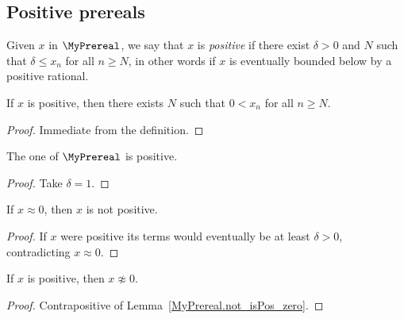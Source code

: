 \subsection{Positive prereals}

\begin{definition}
    \label{MyPrereal.IsPos}
    \leanok
Given $x$ in $\MyPrereal$, we say that $x$ is \emph{positive} if there exist $\delta > 0$ and $N$
such that $\delta \leq x_n$ for all $n \geq N$, in other words if $x$ is eventually bounded below by
a positive rational.
\end{definition}

\begin{lemma}
    \label{MyPrereal.pos_of_isPos}
    \leanok
    If $x$ is positive, then there exists $N$ such that $0 < x_n$ for all $n \geq N$.
\end{lemma}
\begin{proof}
    \leanok
    Immediate from the definition.
\end{proof}

\begin{lemma}
    \label{MyPrereal.one_pos}
    \leanok
    The one of $\MyPrereal$ is positive.
\end{lemma}
\begin{proof}
    \leanok
    Take $\delta = 1$.
\end{proof}

\begin{lemma}
    \label{MyPrereal.not_isPos_zero}
    \leanok
    If $x \approx 0$, then $x$ is not positive.
\end{lemma}
\begin{proof}
    \leanok
    If $x$ were positive its terms would eventually be at least $\delta > 0$, contradicting $x
    \approx 0$.
\end{proof}

\begin{lemma}
    \label{MyPrereal.not_equiv_zero_of_isPos}
    \leanok
    If $x$ is positive, then $x \not\approx 0$.
\end{lemma}
\begin{proof}
    \leanok
    Contrapositive of Lemma~\ref{MyPrereal.not_isPos_zero}.
\end{proof}

